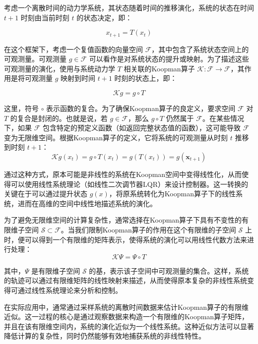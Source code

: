 \documentclass[lang=chs, degree=master, blindreview=false, winfonts=true]{yanputhesis}
\begin{document}
考虑一个离散时间的动力学系统，其状态随着时间的推移演化，系统的状态在时间 \( t+1 \) 时刻由当前时刻 \( t \) 的状态决定，即：

\begin{equation}
    {x}_{t+1} = T({x}_t)
\end{equation}

在这个框架下，考虑一个复值函数的向量空间 \( \mathcal{F} \)，其中包含了系统状态空间上的可观测量。可观测量 \( g \in \mathcal{F} \) 可以看作是对系统状态的提升或映射。为了描述这些可观测量的演化，使用与系统动力学 \( T \) 相关联的Koopman算子 \( \mathcal{K}: \mathcal{F} \to \mathcal{F} \)，其作用是将可观测量 \( g \) 映射到时间 \( t+1 \) 时刻的状态上，即：

\begin{equation}
    \mathcal{K}g = g \circ T
\end{equation}

这里，符号 \( \circ \) 表示函数的复合。为了确保Koopman算子的良定义，要求空间 \( \mathcal{F} \) 对 \( T \) 的复合是封闭的。也就是说，若 \( g \in \mathcal{F} \)，那么 \( g \circ T \) 仍然属于 \( \mathcal{F} \)。在某些情况下，如果 \( \mathcal{F} \) 包含特定的预定义函数（如返回完整状态值的函数），这可能导致 \( \mathcal{F} \) 变为无限维空间。根据Koopman算子的定义，它将系统的可观测量从时刻 \( t \) 推移到时刻 \( t+1 \)：
\begin{equation}
    \mathcal{K}g(x_t) = g \circ T(x_t) = g(T(x_t)) = g(\bm x_{t+1})
\end{equation}

通过这种方式，原本可能是非线性的系统在Koopman空间中变得线性化，从而使得可以使用线性系统理论（如线性二次调节器LQR）来设计控制器。这一转换的关键在于可以通过提升状态 \( g(x) \)，将原系统转化为Koopman算子下的线性系统，进而在高维的空间中线性地描述系统的演化。

为了避免无限维空间的计算复杂性，通常选择在Koopman算子下具有不变性的有限维子空间 \( \mathcal{S} \subset \mathcal{F} \)。当我们限制Koopman算子的作用在这个有限维的子空间 \( \mathcal{S} \) 上时，便可以得到一个有限维的矩阵表示，使得系统的演化可以用线性代数方法来进行处理：
\begin{equation}
    \mathcal{K}\Psi = \Psi \circ T
\end{equation}

其中，\( \Psi \) 是有限维子空间 \( \mathcal{S} \) 的基，表示该子空间中可观测量的集合。这样，系统的轨迹可以通过有限维矩阵的线性映射来描述，从而使得原本复杂的非线性系统变得可通过线性系统理论来分析和控制。

在实际应用中，通常通过采样系统的离散时间数据来估计Koopman算子的有限维近似。这一过程的核心是通过观察数据来构造一个有限维的Koopman算子矩阵，并且在该有限维空间内，系统的演化近似为一个线性系统。这种近似方法可以显著降低计算的复杂性，同时仍然能够有效地捕获系统的非线性特性。
\end{document}
